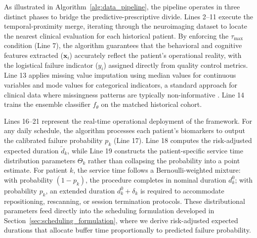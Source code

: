 \documentclass[11pt,a4paper]{article}
\begin{document}
As illustrated in Algorithm~\ref{alg:data_pipeline}, the pipeline operates in three distinct phases to bridge the predictive-prescriptive divide. Lines 2--11 execute the temporal-proximity merge, iterating through the neuroimaging dataset to locate the nearest clinical evaluation for each historical patient. By enforcing the $\tau_{\max}$ condition (Line 7), the algorithm guarantees that the behavioral and cognitive features extracted ($\mathbf{x}_i$) accurately reflect the patient's operational reality, with the logistical failure indicator ($y_i$) assigned directly from quality control metrics. Line 13 applies missing value imputation using median values for continuous variables and mode values for categorical indicators, a standard approach for clinical data where missingness patterns are typically non-informative \citep{sterne2009multiple}. Line 14 trains the ensemble classifier $f_{\theta}$ on the matched historical cohort.

Lines 16--21 represent the real-time operational deployment of the framework. For any daily schedule, the algorithm processes each patient's biomarkers to output the calibrated failure probability $p_k$ (Line 17). Line 18 computes the risk-adjusted expected duration $\tilde{d}_k$, while Line 19 constructs the patient-specific service time distribution parameters $\Theta_k$ rather than collapsing the probability into a point estimate. For patient $k$, the service time follows a Bernoulli-weighted mixture: with probability $(1 - p_k)$, the procedure completes in nominal duration $d_k^0$; with probability $p_k$, an extended duration $d_k^0 + \delta_k$ is required to accommodate repositioning, rescanning, or session termination protocols. These distributional parameters feed directly into the scheduling formulation developed in Section~\ref{sec:scheduling_formulation}, where we derive risk-adjusted expected durations that allocate buffer time proportionally to predicted failure probability.
\end{document}
